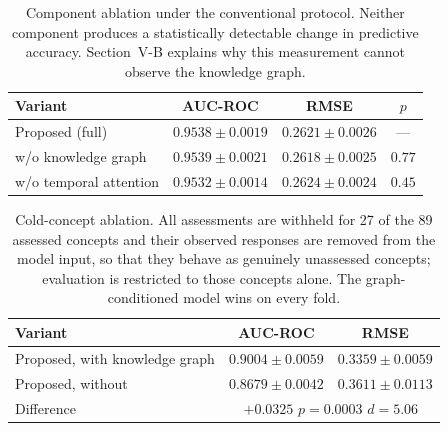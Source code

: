\begin{table}[t]
\centering
\caption{Component ablation under the conventional protocol. Neither component
produces a statistically detectable change in predictive accuracy. Section~V-B
explains why this measurement cannot observe the knowledge graph.}
\label{tab:ablation}
\begin{tabular}{lccc}
\toprule
Variant & AUC-ROC & RMSE & $p$ \\
\midrule
Proposed (full)              & $0.9538 \pm 0.0019$ & $0.2621 \pm 0.0026$ & --- \\
\quad w/o knowledge graph    & $0.9539 \pm 0.0021$ & $0.2618 \pm 0.0025$ & $0.77$ \\
\quad w/o temporal attention & $0.9532 \pm 0.0014$ & $0.2624 \pm 0.0024$ & $0.45$ \\
\bottomrule
\end{tabular}
\end{table}


\begin{table}[t]
\centering
\caption{Cold-concept ablation. All assessments are withheld for 27 of the 89
assessed concepts and their observed responses are removed from the model input, so
that they behave as genuinely unassessed concepts; evaluation is restricted to those
concepts alone. The graph-conditioned model wins on every fold.}
\label{tab:coldconcept}
\begin{tabular}{lcc}
\toprule
Variant & AUC-ROC & RMSE \\
\midrule
Proposed, with knowledge graph & $\mathbf{0.9004 \pm 0.0059}$ & $\mathbf{0.3359 \pm 0.0059}$ \\
Proposed, without              & $0.8679 \pm 0.0042$ & $0.3611 \pm 0.0113$ \\
\midrule
Difference & \multicolumn{2}{c}{$+0.0325$ \quad $p = 0.0003$ \quad $d = 5.06$} \\
\bottomrule
\end{tabular}
\end{table}


